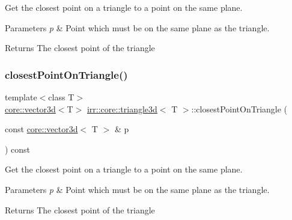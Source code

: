 Get the closest point on a triangle to a point on the same plane. 


\begin{DoxyParams}{Parameters}
{\em p} & Point which must be on the same plane as the triangle. \\
\hline
\end{DoxyParams}
\begin{DoxyReturn}{Returns}
The closest point of the triangle 
\end{DoxyReturn}
\mbox{\label{classirr_1_1core_1_1triangle3d_a0212c09e6804a7a25c3fef791b6b1336}} 
\subsubsection{\texorpdfstring{closest\+Point\+On\+Triangle()}{closestPointOnTriangle()}\hspace{0.1cm}{\footnotesize\ttfamily [2/2]}}
{\footnotesize\ttfamily template$<$class T$>$ \\
\hyperlink{classirr_1_1core_1_1vector3d}{core\+::vector3d}$<$T$>$ \hyperlink{classirr_1_1core_1_1triangle3d}{irr\+::core\+::triangle3d}$<$ T $>$\+::closest\+Point\+On\+Triangle (\begin{DoxyParamCaption}\item[{const \hyperlink{classirr_1_1core_1_1vector3d}{core\+::vector3d}$<$ T $>$ \&}]{p }\end{DoxyParamCaption}) const\hspace{0.3cm}{\ttfamily [inline]}}



Get the closest point on a triangle to a point on the same plane. 


\begin{DoxyParams}{Parameters}
{\em p} & Point which must be on the same plane as the triangle. \\
\hline
\end{DoxyParams}
\begin{DoxyReturn}{Returns}
The closest point of the triangle 
\end{DoxyReturn}
\mbox{\label{classirr_1_1core_1_1triangle3d_a860339e3646bf2f7cbb7e88be1cf0783}} 
